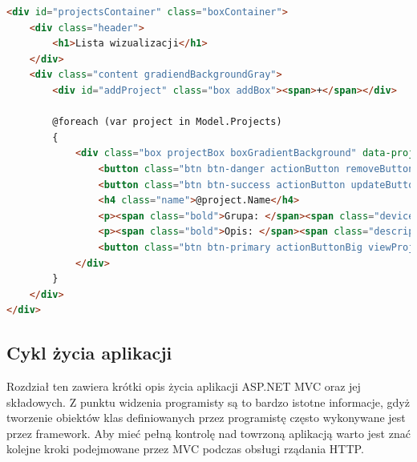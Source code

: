 \begin{lstlisting}[language=HTML]
<div id="projectsContainer" class="boxContainer">
    <div class="header">
        <h1>Lista wizualizacji</h1>
    </div>
    <div class="content gradiendBackgroundGray">
        <div id="addProject" class="box addBox"><span>+</span></div>

        @foreach (var project in Model.Projects)
        {
            <div class="box projectBox boxGradientBackground" data-projectname="@project.Name" data-projectid="@project.Id">
                <button class="btn btn-danger actionButton removeButton"><span class="glyphicon glyphicon-remove"></span></button>
                <button class="btn btn-success actionButton updateButton"><span class="glyphicon glyphicon-pencil"></span></button>
                <h4 class="name">@project.Name</h4>
                <p><span class="bold">Grupa: </span><span class="deviceSchemeName">@project.DeviceScheme.Name</span></p>
                <p><span class="bold">Opis: </span><span class="description">@project.Description</span></p>
                <button class="btn btn-primary actionButtonBig viewProjectButton"><span class=" glyphicon glyphicon-search"></span></button>
            </div>
        }
    </div>
</div>
\end{lstlisting}

\subsection{Cykl życia aplikacji}
Rozdział ten zawiera krótki opis życia aplikacji ASP.NET MVC oraz jej składowych. Z punktu widzenia programisty są to bardzo istotne informacje, gdyż tworzenie obiektów klas definiowanych przez programistę często wykonywane jest przez framework. Aby mieć pełną kontrolę nad towrzoną aplikacją warto jest znać kolejne kroki podejmowane przez MVC podczas obsługi rządania HTTP.

